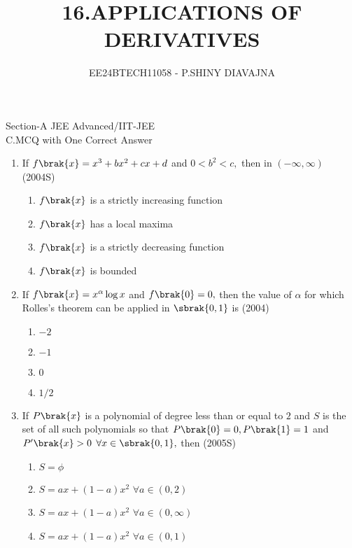 \documentclass[journal,12pt,twocolumn]{IEEEtran}
\theoremstyle{remark}
\begin{document}

\vspace{3cm}

\title{16.APPLICATIONS OF DERIVATIVES}
\author{EE24BTECH11058 - P.SHINY DIAVAJNA}

\maketitle
\newpage
\bigskip


\renewcommand{\thefigure}{\theenumi}
\renewcommand{\thetable}{\theenumi}

  Section-A JEE Advanced/IIT-JEE\\
  
  C.MCQ with One Correct Answer\\ 
    \begin{enumerate} 
      \item
	  If $f\brak{x}=x^3+bx^2+cx+d$ and $0<b^2<c,$ then in $(-\infty,\infty)$ \hfill(2004S)
        \begin{enumerate}
	 \item $f\brak{x}$ is a strictly increasing function
	 \item $f\brak{x}$ has a local maxima
	 \item $f\brak{x}$ is a strictly decreasing function
	 \item $f\brak{x}$ is bounded  \\
        \end{enumerate}
    
 
       \item
	       If $f\brak{x}=x^{\alpha} \log x$ and $f\brak{0}=0,$ then the value of $\alpha$ for which Rolles's theorem can be applied in $\sbrak{0,1}$ is 
		    \hfill(2004) 
        \begin {enumerate}
         \item $-2$
         \item $-1$
         \item $0$
         \item $1/2$\\
        \end{enumerate}
   
    
     \item
	     If $P\brak{x}$ is a polynomial of degree less than or equal to $2$ and $S$ is the set of all such polynomials so that $P\brak{0}=0,P\brak{1}=1$ and $P^{\prime}\brak{x}>0$ $\forall x \in \sbrak{0,1},$ then
     \hfill(2005S)
    \begin{enumerate}
        \item  $S=\phi$
        \item  $S=ax+(1-a)x^2$ $\forall a \in (0,2)$
        \item  $S=ax+(1-a)x^2$ $\forall a\in (0,\infty)$
        \item  $S=ax+(1-a)x^2$ $\forall a \in (0,1)$ \\
    \end{enumerate} 
    

\end{enumerate}
\end{document}
